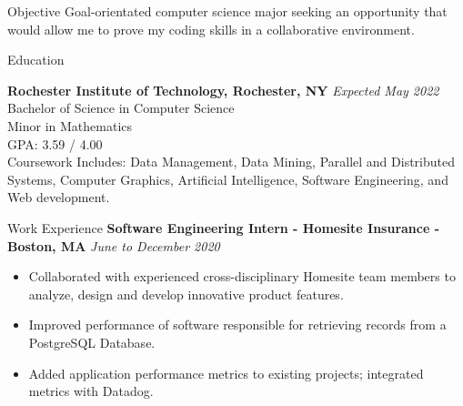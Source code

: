 \documentclass{resume} %
\begin{document}

\begin{rSection}{Objective}
Goal-orientated computer science major seeking an opportunity that would allow me to prove my
coding skills in a collaborative environment.
\end{rSection}

\begin{rSection}{Education}

{\bf Rochester Institute of Technology, Rochester, NY} \hfill {\em Expected May 2022} 
\\ Bachelor of Science in Computer Science
\\ Minor in Mathematics
\\ GPA: 3.59 / 4.00
\\ Coursework Includes:  Data Management, Data Mining, Parallel and Distributed Systems, Computer Graphics, Artificial Intelligence, Software Engineering, and Web development.

\end{rSection}


\begin{rSection}{Work Experience} 
{\bf Software Engineering Intern - Homesite Insurance - Boston, MA} \hfill {\em June to December 2020}
\begin{itemize}[noitemsep]
    \item Collaborated with experienced cross-disciplinary Homesite team members to analyze, design and develop innovative product features.
    \item Improved performance of software responsible for retrieving records from a PostgreSQL Database. 
    \item Added application performance metrics to existing projects; integrated metrics with Datadog.
\end{itemize}
\end{rSection}
\end{document}
